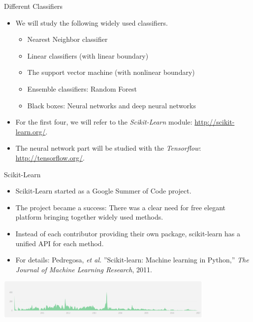 \documentclass[10pt, aspectratio=169]{beamer} %
\begin{document}
\begin{frame}{Different Classifiers}
\begin{itemize}
\item We will study the following
widely used classifiers.
\begin{itemize}
\item Nearest Neighbor classifier
\item Linear classifiers (with linear boundary)
\item The support vector machine (with nonlinear boundary)
\item Ensemble classifiers: Random Forest
\item Black boxes: Neural networks and deep neural networks
\end{itemize}
\item For the first four, we will refer to the \emph{Scikit-Learn}
module: \url{http://scikit-learn.org/}.
\item The neural network part will be studied with the \emph{Tensorflow}: \url{http://tensorflow.org/}.
\end{itemize}
\end{frame}


\begin{frame}{Scikit-Learn}
\begin{itemize}
\item Scikit-Learn started as a Google Summer of Code project.
\item The project became a success: There was a clear need for free elegant platform bringing together
widely used methods.
\item Instead of each contributor providing their own package, scikit-learn has a unified
API for each method.
\item For details: Pedregosa, \textit{et al.} ''Scikit-learn: Machine learning in Python,'' \textit{The Journal of Machine Learning Research}, 2011.
\end{itemize}
\centerline{\includegraphics[width=0.8\textwidth]{sklearn-pulse.png}}
\end{frame}
\end{document}
